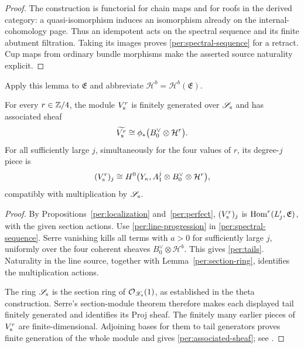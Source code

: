 \begin{proof}
The construction is functorial for chain maps and for roofs in
the derived category: a quasi-isomorphism induces an isomorphism
already on the internal-cohomology page.  Thus an idempotent acts
on the spectral sequence and its finite abutment filtration.
Taking its images proves \eqref{per:spectral-sequence} for a
retract.  Cup maps from ordinary bundle morphisms make the asserted
source naturality explicit.
\end{proof}

Apply this lemma to $\mathfrak E$ and abbreviate
$\mathcal H^b=\mathcal H^b(\mathfrak E)$.

\begin{proposition}
\label{per:finite-generation}
For every $r\in\mathbb Z/4$, the module $V_{\rm s}^r$ is finitely generated
over $\mathscr S_{\rm s}$ and has associated sheaf
\begin{equation}
 \widetilde{V_{\rm s}^r}
   \cong\phi_*\bigl(B_0^\vee\otimes\mathcal H^r\bigr).
 \label{per:associated-sheaf}
\end{equation}
For all sufficiently large $j$, simultaneously for the four values
of $r$, its degree-$j$ piece is
\begin{equation}
 (V_{\rm s}^r)_j
  \cong H^0\bigl(Y_\kappa,
       A_1^j\otimes B_0^\vee\otimes\mathcal H^r\bigr),
 \label{per:tails}
\end{equation}
compatibly with multiplication by $\mathscr S_{\rm s}$.
\end{proposition}

\begin{proof}
By Propositions~\ref{per:localization} and~\ref{per:perfect},
$(V_{\rm s}^r)_j$ is $\operatorname{Hom}^r(L_j',\mathfrak E)$, with the given
section actions.  Use \eqref{per:line-progression} in
\eqref{per:spectral-sequence}.  Serre vanishing kills all terms
with $a>0$ for sufficiently large $j$, uniformly over the four
coherent sheaves $B_0^\vee\otimes\mathcal H^b$.  This gives
\eqref{per:tails}.  Naturality in the line source, together with
Lemma~\ref{per:section-ring}, identifies the multiplication actions.

The ring $\mathscr S_{\rm s}$ is the section ring of
$\mathcal O_{\mathscr X_{\rm s}}(1)$, as established in the theta
construction.  Serre's section-module theorem therefore makes
each displayed tail finitely generated and identifies its Proj
sheaf.  The finitely many earlier pieces of $V_{\rm s}^r$ are
finite-dimensional.  Adjoining bases for them to tail generators
proves finite generation of the whole module and gives
\eqref{per:associated-sheaf}; see \cite{serre-proj}.
\end{proof}

